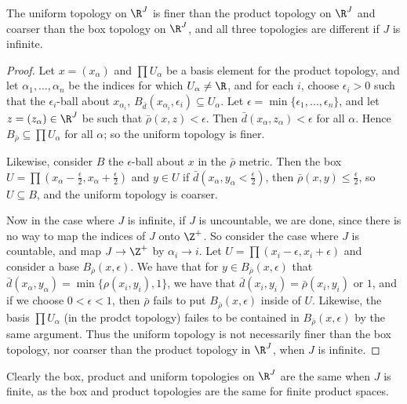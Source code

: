 \begin{theorem}\label{2.2.8}
    The uniform topology on $\R^J$ is finer than the product topology on  $\R^J$ and coarser than
    the box topology on  $\R^J$, and all three topologies are different if  $J$ is infinite.
\end{theorem}
\begin{proof}
    Let $x=(x_\alpha)$ and $\prod{U_{\alpha}}$ be a basis element for the product topology, and
    let $\alpha_1 ,\dots, \alpha_n$ be the indices for which $U_{\alpha} \neq \R$, and for each $i$,
    choose  $\epsilon_i>0$ such that the  $\epsilon_i$-ball about  $x_{\alpha_i}$,
    $B_{\bar{d}}(x_{\alpha_i},\epsilon_i) \subseteq U_{\alpha}$. Let $\epsilon=\min\{\epsilon_1,
    \dots, \epsilon_n\}$, and let $z=(z_{\alpha}) \in \R^J$ be such that $\bar{\rho}(x,z)<\epsilon$.
    Then $\bar{d}(x_{\alpha},z_{\alpha})<\epsilon$ for all $\alpha$. Hence  $B_{\bar{\rho}}
    \subseteq \prod{U_{\alpha}}$ for all $\alpha$; so the uniform topology is finer.

    Likewise, consider $B$ the $\epsilon$-ball about  $x$ in the  $\bar{\rho}$ metric. Then the box
    $U=\prod{(x_{\alpha}-\frac{\epsilon}{2},x_{\alpha}+\frac{\epsilon}{2})}$ and $y \in U$ if
    $\bar{d}(x_{\alpha},y_{\alpha}<\frac{\epsilon}{2})$, then $\bar {\rho}(x,y) \leq
    \frac{\epsilon}{2}$, so $U \subseteq B$, and the uniform topology is coarser.

    Now in the case where  $J$ is infinite, if  $J$ is uncountable, we are done, since there is no
    way to map the indices of  $J$ onto  $\Z^+$. So consider the case where  $J$ is countable, and
    map  $J \rightarrow \Z^+$ by  $\alpha_i \rightarrow i$. Let
    $U=\prod{(x_i-\epsilon,x_i+\epsilon)}$ and consider a base $B_{\bar{\rho}}(x,\epsilon)$. We have
    that for  $y \in B_{\bar{\rho}}(x,\epsilon)$ that
    $\bar{d}(x_{\alpha},y_{\alpha})=\min\{\rho(x_i,y_i),1\}$, we have that
    $\bar{d}(x_i,y_i)=\bar{\rho}(x_i,y_i)$ or $1$, and if we choose  $0<\epsilon<1$, then
    $\bar{\rho}$ fails to put $B_{\bar{\rho}}(x,\epsilon)$ inside of $U$. Likewise, the basis
    $\prod{U_{\alpha}}$ (in the prodct topology) failes to be contained in
    $B_{\bar{\rho}}(x,\epsilon)$ by the same argument. Thus the uniform topology is not necessarily finer than
    the box topology, nor coarser than the product topology in $\R^J$, when $J$ is infinite.
\end{proof}
\begin{remark}
    Clearly the box, product and uniform topologies on $\R^J$ are the same when  $J$ is finite, as
    the box and product topologies are the same for finite product spaces.
\end{remark}

